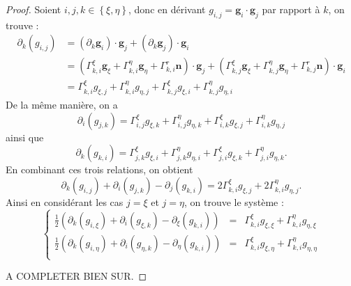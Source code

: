 \begin{proof}
Soient $i,j, k  \in \left\lbrace \xi, \eta \right\rbrace$, donc en dérivant $g_{i,j} = \mathbf{g}_i \cdot \mathbf{g}_j$ par rapport à $k$, on trouve :
\begin{align*}
\partial_k (g_{i,j}) & = (\partial_k \mathbf{g}_i ) \cdot \mathbf{g}_j + (\partial_k \mathbf{g}_j ) \cdot \mathbf{g}_i\\
	& = \left( \Gamma_{k,i}^{\xi} \mathbf{g}_{\xi} + \Gamma_{k,i}^{\eta} \mathbf{g}_{\eta} + \Gamma_{k,i}^{r} \textbf{n} \right) \cdot \mathbf{g}_j + \left( \Gamma_{k,j}^{\xi} \mathbf{g}_{\xi} + \Gamma_{k,j}^{\eta} \mathbf{g}_{\eta} + \Gamma_{k,j}^{r} \textbf{n} \right) \cdot \mathbf{g}_i \\
	& = \Gamma_{k,i}^{\xi} g_{\xi,j} + \Gamma_{k,i}^{\eta} g_{\eta,j} + \Gamma_{k,j}^{\xi} g_{\xi,i} + \Gamma_{k,j}^{\eta} g_{\eta,i} 
\end{align*}
De la même manière, on a 
\begin{equation}
\partial_i (g_{j,k}) = \Gamma_{i,j}^{\xi} g_{\xi,k} + \Gamma_{i,j}^{\eta} g_{\eta,k} + \Gamma_{i,k}^{\xi} g_{\xi,j} + \Gamma_{i,k}^{\eta} g_{\eta,j}
\end{equation}
ainsi que
\begin{equation}
\partial_k (g_{k,i}) = \Gamma_{j,k}^{\xi} g_{\xi,i} + \Gamma_{j,k}^{\eta} g_{\eta,i} + \Gamma_{j,i}^{\xi} g_{\xi,k} + \Gamma_{j,i}^{\eta} g_{\eta,k}.
\end{equation}
En combinant ces trois relations, on obtient
\begin{equation}
\partial_k (g_{i,j}) + \partial_i (g_{j,k}) - \partial_j (g_{k,i}) = 2 \Gamma_{k,i}^{\xi} g_{\xi,j} + 2 \Gamma_{k,i}^{\eta} g_{\eta,j}.
\end{equation}
Ainsi en considérant les cas $j=\xi$ et $j=\eta$, on trouve le système :
\begin{equation}
\left\lbrace
\begin{array}{rcl}
\frac{1}{2} \left( \partial_k (g_{i,\xi}) + \partial_i (g_{\xi,k}) - \partial_{\xi} (g_{k,i}) \right) & = & \Gamma_{k,i}^{\xi} g_{\xi,\xi} + \Gamma_{k,i}^{\eta} g_{\eta,\xi} \\
\frac{1}{2} \left( \partial_k (g_{i,\eta}) + \partial_i (g_{\eta,k}) - \partial_{\eta} (g_{k,i}) \right) & = & \Gamma_{k,i}^{\xi} g_{\xi,\eta} + \Gamma_{k,i}^{\eta} g_{\eta,\eta} \\
\end{array}
\right.
\end{equation}

A COMPLETER BIEN SUR.
\end{proof}

















